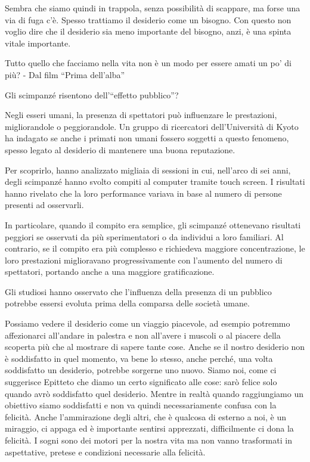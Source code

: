 \documentclass[12pt]{book} %
\begin{document}
Sembra che siamo quindi in trappola, senza possibilità di scappare, ma forse una via di fuga c'è.
Spesso trattiamo il desiderio come un bisogno. Con questo non voglio dire che il desiderio sia meno importante del
bisogno, anzi, è una spinta vitale importante.

Tutto quello che facciamo nella vita non è un modo per essere amati un po' di più? - Dal film “Prima dell'alba”

\begin{mdframed}[linewidth=1pt]
Gli scimpanzé risentono dell’“effetto pubblico”?

Negli esseri umani, la presenza di spettatori può influenzare le prestazioni, migliorandole o peggiorandole. Un gruppo di ricercatori dell’Università di Kyoto ha indagato se anche i primati non umani fossero soggetti a questo fenomeno, spesso legato al desiderio di mantenere una buona reputazione.

Per scoprirlo, hanno analizzato migliaia di sessioni in cui, nell’arco di sei anni, degli scimpanzé hanno svolto compiti al computer tramite touch screen. I risultati hanno rivelato che la loro performance variava in base al numero di persone presenti ad osservarli.

In particolare, quando il compito era semplice, gli scimpanzé ottenevano risultati peggiori se osservati da più sperimentatori o da individui a loro familiari. Al contrario, se il compito era più complesso e richiedeva maggiore concentrazione, le loro prestazioni miglioravano progressivamente con l’aumento del numero di spettatori, portando anche a una maggiore gratificazione.

Gli studiosi hanno osservato che l'influenza della presenza di un pubblico potrebbe essersi evoluta prima della comparsa delle società umane.
\end{mdframed}

Possiamo vedere il desiderio come un viaggio piacevole, ad esempio potremmo affezionarci
 all'andare in palestra e non all'avere i muscoli o al piacere della scoperta più che al mostrare di
 sapere tante cose. Anche se il nostro desiderio non è soddisfatto in quel momento, va bene lo stesso, anche perché, una volta soddisfatto un desiderio, potrebbe sorgerne uno nuovo. Siamo noi, come ci suggerisce Epitteto
che diamo un certo significato alle cose: sarò felice solo quando avrò soddisfatto quel desiderio. Mentre in realtà
quando raggiungiamo un obiettivo siamo soddisfatti e non va quindi necessariamente confusa con la felicità. Anche
l'ammirazione degli altri, che è qualcosa di esterno a noi, è un miraggio, ci appaga ed è
importante sentirsi apprezzati, difficilmente ci dona la felicità. I sogni sono dei motori per la nostra vita ma non vanno
trasformati in aspettative, pretese e condizioni necessarie alla felicità.
\end{document}
